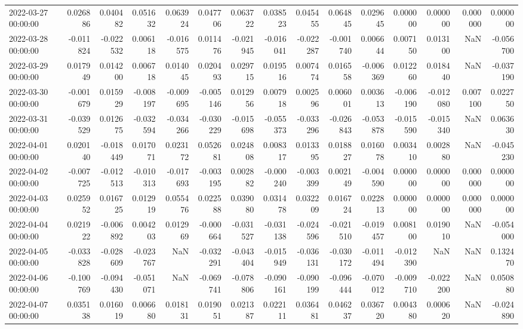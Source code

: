 \begin{tabular}{lrrrrrrrrrrrrrr}
2022-03-27 00:00:00 & 0.026886 & 0.040482 & 0.051632 & 0.063924 & 0.047706 & 0.063722 & 0.038523 & 0.045455 & 0.064845 & 0.029645 & 0.000000 & 0.000000 & 0.000000 & 0.000000 \\
2022-03-28 00:00:00 & -0.011824 & -0.022532 & 0.006118 & -0.016575 & 0.011476 & -0.021945 & -0.016041 & -0.022287 & -0.001740 & 0.006644 & 0.007150 & 0.013100 & NaN & -0.056700 \\
2022-03-29 00:00:00 & 0.017949 & 0.014200 & 0.006718 & 0.014045 & 0.020493 & 0.029715 & 0.019516 & 0.007474 & 0.016558 & -0.006369 & 0.012260 & 0.018440 & NaN & -0.037190 \\
2022-03-30 00:00:00 & -0.001679 & 0.015929 & -0.008197 & -0.009695 & -0.005146 & 0.012956 & 0.007918 & 0.002596 & 0.006001 & 0.003613 & -0.006190 & -0.012080 & 0.007100 & 0.022750 \\
2022-03-31 00:00:00 & -0.039529 & 0.012675 & -0.032594 & -0.034266 & -0.030229 & -0.015698 & -0.055373 & -0.033296 & -0.026843 & -0.053878 & -0.015590 & -0.015340 & NaN & 0.063630 \\
2022-04-01 00:00:00 & 0.020140 & -0.018449 & 0.017071 & 0.023172 & 0.052681 & 0.024808 & 0.008317 & 0.013395 & 0.018827 & 0.016078 & 0.003410 & 0.002880 & NaN & -0.045230 \\
2022-04-02 00:00:00 & -0.007725 & -0.012513 & -0.010313 & -0.017693 & -0.003195 & 0.002882 & -0.000240 & -0.003399 & 0.002149 & -0.004590 & 0.000000 & 0.000000 & 0.000000 & 0.000000 \\
2022-04-03 00:00:00 & 0.025952 & 0.016725 & 0.012919 & 0.055476 & 0.022588 & 0.039080 & 0.031478 & 0.032209 & 0.016724 & 0.022813 & 0.000000 & 0.000000 & 0.000000 & 0.000000 \\
2022-04-04 00:00:00 & 0.021922 & -0.006892 & 0.004203 & 0.012969 & -0.000664 & -0.031527 & -0.031138 & -0.024596 & -0.021510 & -0.019457 & 0.008100 & 0.019010 & NaN & -0.054000 \\
2022-04-05 00:00:00 & -0.033828 & -0.028609 & -0.023767 & NaN & -0.032291 & -0.043404 & -0.015949 & -0.036131 & -0.030172 & -0.011494 & -0.012390 & NaN & NaN & 0.132470 \\
2022-04-06 00:00:00 & -0.100769 & -0.094430 & -0.051071 & NaN & -0.069741 & -0.078806 & -0.090161 & -0.090199 & -0.096444 & -0.070012 & -0.009710 & -0.022200 & NaN & 0.050880 \\
2022-04-07 00:00:00 & 0.035138 & 0.016019 & 0.006680 & 0.018131 & 0.019051 & 0.021387 & 0.022111 & 0.036481 & 0.046237 & 0.036720 & 0.004380 & 0.000620 & NaN & -0.024890 \\

\end{tabular}
